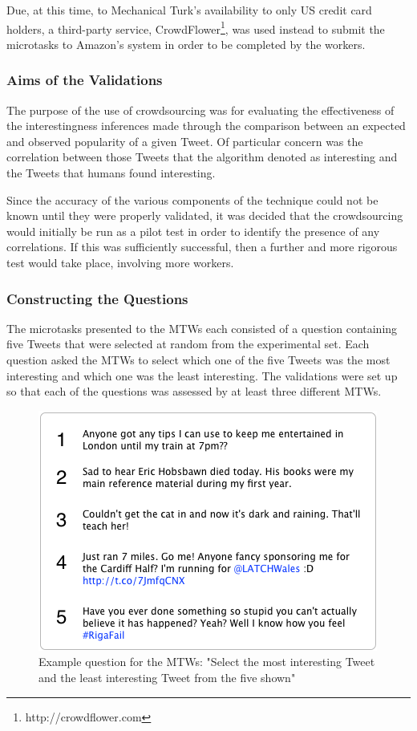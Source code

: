 Due, at this time, to Mechanical Turk's availability to only US credit card holders, a third-party service, CrowdFlower\footnote{http://crowdflower.com}, was used instead to submit the microtasks to Amazon's system in order to be completed by the workers. 


\subsubsection{Aims of the Validations}
The purpose of the use of crowdsourcing was for evaluating the effectiveness of the interestingness inferences made through the comparison between an expected and observed popularity of a given Tweet. Of particular concern was the correlation between those Tweets that the algorithm denoted as interesting and the Tweets that humans found interesting.

Since the accuracy of the various components of the technique could not be known until they were properly validated, it was decided that the crowdsourcing would initially be run as a pilot test in order to identify the presence of any correlations. If this was sufficiently successful, then a further and more rigorous test would take place, involving more workers.


\subsubsection{Constructing the Questions}
The microtasks presented to the MTWs each consisted of a question containing five Tweets that were selected at random from the experimental set. Each question asked the MTWs to select which one of the five Tweets was the most interesting and which one was the least interesting. The validations were set up so that each of the questions was assessed by at least three different MTWs.

\begin{figure}[h]
\centering
\includegraphics[scale=0.8]{4.Chapter2/Media/mtk_question.png} 
\caption{Example question for the MTWs: "Select the most interesting Tweet and the least interesting Tweet from the five shown"}
\label{fig:mtk_question}
\end{figure}

